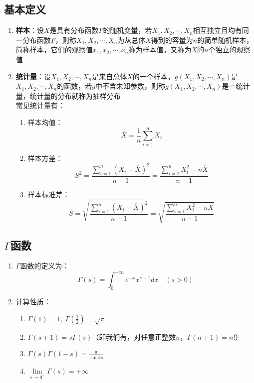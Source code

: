 \documentclass[12pt,a4paper,UTF8]{book}
\begin{document}
\subsection{基本定义}
\begin{enumerate}
\item \textbf{样本}：设$X$是具有分布函数$F$的随机变量，若$X_1,X_2,\cdots,X_n$相互独立且均有同一分布函数$F$，则称$X_1,X_2,\cdots,X_n$为从总体$X$得到的容量为$n$的简单随机样本，简称样本，它们的观察值$x_1,x_2,\cdots,x_n$称为样本值，又称为$X$的$n$个独立的观察值
\item \textbf{统计量}：设$X_1,X_2,\cdots,X_n$是来自总体$X$的一个样本，$g\left(X_1,X_2,\cdots,X_n\right)$是$X_1,X_2,\cdots,X_n$的函数，若$g$中不含未知参数，则称$g\left(X_1,X_2,\cdots,X_n\right)$是一统计量，统计量的分布就称为抽样分布\\
常见统计量有：
\begin{enumerate}
\item 样本均值：
\[\overline{X}=\frac{1}{n}\sum\limits_{i=1}^{n}X_i\]
\item 样本方差：
\[S^2=\frac{\sum\limits_{i=1}^{n}\left(X_i-\overline{X}\right)^2}{n-1}=\frac{\sum\limits_{i=1}^{n}X_i^2-n\overline{X}}{n-1}\]
\item 样本标准差：
\[S=\sqrt{\frac{\sum\limits_{i=1}^{n}\left(X_i-\overline{X}\right)^2}{n-1}}=\sqrt{\frac{\sum\limits_{i=1}^{n}X_i^2-n\overline{X}}{n-1}}\]
\end{enumerate}
\end{enumerate}

\subsection{$\Gamma$函数}
\begin{enumerate}
\item $\Gamma$函数的定义为：
\[\Gamma\left(s\right)=\int_{0}^{+\infty}e^{-x}x^{s-1}dx\quad\left(s>0\right)\]
\item 计算性质：
\begin{enumerate}
\item $\Gamma\left(1\right)=1,\ \Gamma\left(\frac{1}{2}\right)=\sqrt{\pi}$
\item $\Gamma\left(s+1\right)=s\Gamma\left(s\right)$（即我们有，对任意正整数$n$，$\Gamma\left(n+1\right)=n!$）
\item $\Gamma\left(s\right)\Gamma\left(1-s\right)=\frac{\pi}{\sin\pi s}$
\item $\lim\limits_{s\to 0^{+}}\Gamma\left(s\right)=+\infty$
\end{enumerate}
\end{enumerate}
\end{document}
